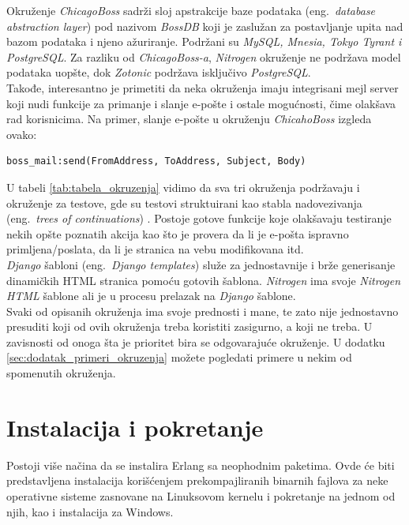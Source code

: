 \documentclass[a4paper]{article}
\begin{document}
Okruženje {\em ChicagoBoss} sadrži sloj apstrakcije baze podataka (eng.~{\em database abstraction layer}) pod nazivom {\em BossDB} \cite{ChicagoBossDocumentation} koji je zaslužan za postavljanje upita nad bazom podataka i njeno ažuriranje. 
Podržani su {\em MySQL, Mnesia, Tokyo Tyrant i PostgreSQL}. 
Za razliku od {\em ChicagoBoss-a}, {\em Nitrogen} okruženje ne podržava model podataka uopšte, dok {\em Zotonic} \cite{ZotonicDocumentation} podržava isključivo {\em PostgreSQL}.\\

Takođe, interesantno je primetiti da neka okruženja imaju integrisani mejl server koji nudi funkcije za primanje i slanje e-pošte i ostale mogućnosti, 
čime olakšava rad korisnicima. 
Na primer, slanje e-pošte u okruženju {\em ChicahoBoss} izgleda ovako:

\begin{verbatim}
boss_mail:send(FromAddress, ToAddress, Subject, Body)
\end{verbatim} 

U tabeli \ref{tab:tabela_okruzenja} vidimo da sva tri okruženja podržavaju 
i okruženje za testove, gde su testovi struktuirani kao stabla nadovezivanja (eng.~{\em trees of continuations}) \cite{EvanMillerTesting}. 
Postoje gotove funkcije koje olakšavaju testiranje nekih opšte poznatih akcija kao što je 
provera da li je e-pošta ispravno primljena/poslata, da li je stranica na vebu modifikovana itd. \\

{\em Django} šabloni (eng.~{\em Django templates}) \cite{DjangoTempDoc} služe za jednostavnije i brže generisanje dinamičkih HTML stranica pomoću gotovih šablona.
 {\em Nitrogen} ima svoje {\em Nitrogen HTML} šablone ali je u procesu prelazak na {\em Django} šablone.\\
 
Svaki od opisanih okruženja ima svoje prednosti i mane, 
te zato nije jednostavno presuditi koji od ovih okruženja treba koristiti zasigurno, a koji ne treba. 
U zavisnosti od onoga šta je prioritet bira se odgovarajuće okruženje. 
U dodatku \ref{sec:dodatak_primeri_okruzenja} možete pogledati primere u nekim od spomenutih okruženja.

\section{Instalacija i pokretanje}
\label{sec:instalacija}
Postoji više načina da se instalira Erlang sa neophodnim paketima.
Ovde će biti predstavljena instalacija korišćenjem prekompajliranih binarnih fajlova 
za neke operativne sisteme zasnovane na Linuksovom kernelu i pokretanje na jednom od njih, kao i instalacija za Windows.
\end{document}
